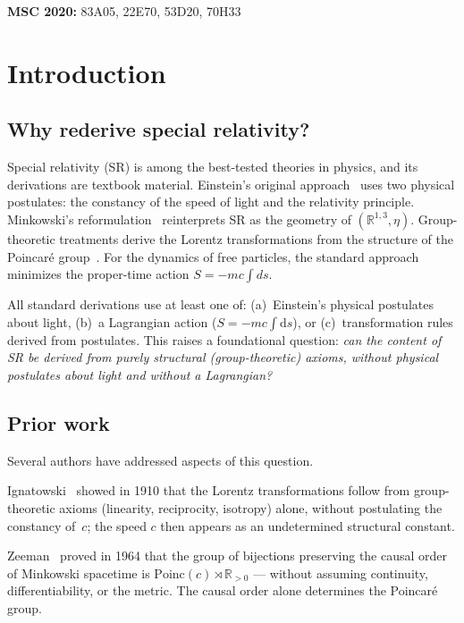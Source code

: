 \documentclass[12pt]{article}
\theoremstyle{plain}
\theoremstyle{definition}
\theoremstyle{remark}
\newcommand{\R}{\mathbb{R}}
\newcommand{\Poinc}{\mathrm{Poinc}}
\newcommand{\dd}{\mathrm{d}}
\begin{document}
\noindent\textbf{MSC 2020:} 83A05, 22E70, 53D20, 70H33


\section{Introduction}
\label{sec:intro}

\subsection{Why rederive special relativity?}

Special relativity (SR) is among the best-tested theories in physics, and its derivations are textbook material. Einstein's original approach~\cite{einstein1905} uses two physical postulates: the constancy of the speed of light and the relativity principle. Minkowski's reformulation~\cite{minkowski1908} reinterprets SR as the geometry of $(\R^{1,3}, \eta)$. Group-theoretic treatments derive the Lorentz transformations from the structure of the Poincar\'e group~\cite{weinberg1995,wald1984}. For the dynamics of free particles, the standard approach minimizes the proper-time action $S = -mc\int ds$.

All standard derivations use at least one of: (a)~Einstein's physical postulates about light, (b)~a Lagrangian action ($S = -mc\int \dd s$), or (c)~transformation rules derived from postulates. This raises a foundational question: \emph{can the content of SR be derived from purely structural (group-theoretic) axioms, without physical postulates about light and without a Lagrangian?}

\subsection{Prior work}

Several authors have addressed aspects of this question.

Ignatowski~\cite{ignatowski1910} showed in 1910 that the Lorentz transformations follow from group-theoretic axioms (linearity, reciprocity, isotropy) alone, without postulating the constancy of~$c$; the speed $c$ then appears as an undetermined structural constant.

Zeeman~\cite{zeeman1964} proved in 1964 that the group of bijections preserving the causal order of Minkowski spacetime is $\Poinc(c) \rtimes \R_{>0}$ --- without assuming continuity, differentiability, or the metric. The causal order alone determines the Poincar\'e group.
\end{document}
